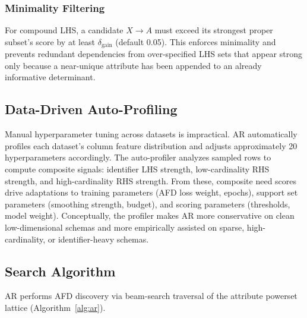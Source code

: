 \documentclass[conference]{IEEEtran}
\begin{document}
\subsubsection{Minimality Filtering}
For compound LHS, a candidate $X \to A$ must exceed its strongest proper subset's score by at least $\delta_{\text{gain}}$ (default 0.05). This enforces minimality and prevents redundant dependencies from over-specified LHS sets that appear strong only because a near-unique attribute has been appended to an already informative determinant.

\subsection{Data-Driven Auto-Profiling}\label{sec:autoprofile}

Manual hyperparameter tuning across datasets is impractical. AR automatically profiles each dataset's column feature distribution and adjusts approximately 20 hyperparameters accordingly. The auto-profiler analyzes sampled rows to compute composite signals: identifier LHS strength, low-cardinality RHS strength, and high-cardinality RHS strength. From these, composite need scores drive adaptations to training parameters (AFD loss weight, epochs), support set parameters (smoothing strength, budget), and scoring parameters (thresholds, model weight). Conceptually, the profiler makes AR more conservative on clean low-dimensional schemas and more empirically assisted on sparse, high-cardinality, or identifier-heavy schemas.

\subsection{Search Algorithm}

AR performs AFD discovery via beam-search traversal of the attribute powerset lattice (Algorithm~\ref{alg:ar}).
\end{document}
